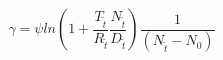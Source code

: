 \documentclass[10pt]{article}
\begin{document}
\[\gamma = {\psi} ln\left(1+\frac{{T_{\tilde{t}}}}{{R_{\tilde{t}}}} \frac{{N_{\tilde{t}}}}{{D_{\tilde{t}}}}\right)
\frac{1}{({N_{\tilde{t}}}-{N_0})}\]
\end{document}
